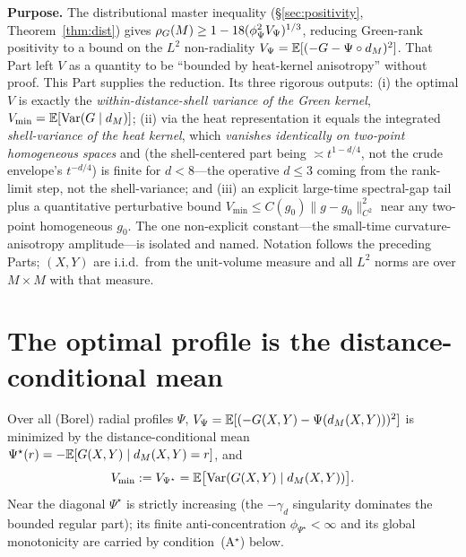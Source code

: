 
\noindent\textbf{Purpose.} The distributional master inequality (\S\ref{sec:positivity}, Theorem~\ref{thm:dist}) gives
$\rho_G(M)\ge1-18(\phi_\Psi^2V_\Psi)^{1/3}$, reducing Green-rank positivity to a bound on the
$L^2$ non-radiality $V_\Psi=\mathbb E[(-G-\Psi\circ d_M)^2]$. That Part left $V$ as a quantity to be
``bounded by heat-kernel anisotropy'' without proof. This Part supplies the reduction. Its
three rigorous outputs: (i) the optimal $V$ is exactly the \emph{within-distance-shell
variance of the Green kernel}, $V_{\min}=\mathbb E[\operatorname{Var}(G\mid d_M)]$; (ii) via the heat
representation it equals the integrated \emph{shell-variance of the heat kernel}, which
\emph{vanishes identically on two-point homogeneous spaces} and (the shell-centered part
being $\asymp t^{1-d/4}$, not the crude envelope's $t^{-d/4}$) is finite for $d<8$---the
operative $d\le3$ coming from the rank-limit step, not the shell-variance; and (iii) an explicit
large-time spectral-gap tail plus a quantitative perturbative bound
$V_{\min}\le C(g_0)\lVert g-g_0\rVert_{C^2}^2$ near any two-point homogeneous $g_0$. The one
non-explicit constant---the small-time curvature-anisotropy amplitude---is isolated and
named. Notation follows the preceding Parts; $(X,Y)$ are i.i.d.\ from the unit-volume
measure and all $L^2$ norms are over $M\times M$ with that measure.

\section{The optimal profile is the distance-conditional mean}

\begin{proposition}\label{prop:condvar}
Over all (Borel) radial profiles $\Psi$, $V_\Psi=\mathbb E[(-G(X,Y)-\Psi(d_M(X,Y)))^2]$ is minimized
by the distance-conditional mean $\Psi^\star(r)=-\mathbb E[G(X,Y)\mid d_M(X,Y)=r]$, and
\[
V_{\min}:=V_{\Psi^\star}=\mathbb E\bigl[\operatorname{Var}(G(X,Y)\mid d_M(X,Y))\bigr].
\]
Near the diagonal $\Psi^\star$ is strictly increasing (the $-\gamma_d$ singularity dominates
the bounded regular part); its finite anti-concentration $\phi_{\Psi^\star}<\infty$ and its
global monotonicity are carried by condition~\textup{(A$^\star$)} below.
\end{proposition}

